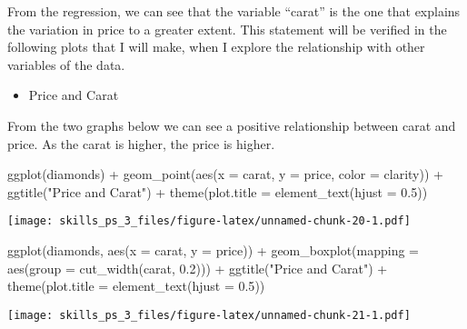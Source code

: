 \documentclass[
]{article}
\newenvironment{Shaded}{\begin{snugshade}}{\end{snugshade}}
\newcommand{\AttributeTok}[1]{\textcolor[rgb]{0.77,0.63,0.00}{#1}}
\newcommand{\FloatTok}[1]{\textcolor[rgb]{0.00,0.00,0.81}{#1}}
\newcommand{\FunctionTok}[1]{\textcolor[rgb]{0.00,0.00,0.00}{#1}}
\newcommand{\NormalTok}[1]{#1}
\newcommand{\SpecialCharTok}[1]{\textcolor[rgb]{0.00,0.00,0.00}{#1}}
\newcommand{\StringTok}[1]{\textcolor[rgb]{0.31,0.60,0.02}{#1}}
\providecommand{\tightlist}{%
  \setlength{\itemsep}{0pt}\setlength{\parskip}{0pt}}
\begin{document}
From the regression, we can see that the variable ``carat'' is the one
that explains the variation in price to a greater extent. This statement
will be verified in the following plots that I will make, when I explore
the relationship with other variables of the data.

\begin{itemize}
\tightlist
\item
  Price and Carat
\end{itemize}

From the two graphs below we can see a positive relationship between
carat and price. As the carat is higher, the price is higher.

\begin{Shaded}
\begin{Highlighting}[]
\FunctionTok{ggplot}\NormalTok{(diamonds) }\SpecialCharTok{+} 
  \FunctionTok{geom\_point}\NormalTok{(}\FunctionTok{aes}\NormalTok{(}\AttributeTok{x =}\NormalTok{ carat, }\AttributeTok{y =}\NormalTok{ price, }\AttributeTok{color =}\NormalTok{ clarity)) }\SpecialCharTok{+}
  \FunctionTok{ggtitle}\NormalTok{(}\StringTok{"Price and Carat"}\NormalTok{) }\SpecialCharTok{+}
  \FunctionTok{theme}\NormalTok{(}\AttributeTok{plot.title =} \FunctionTok{element\_text}\NormalTok{(}\AttributeTok{hjust =} \FloatTok{0.5}\NormalTok{))}
\end{Highlighting}
\end{Shaded}

\texttt{[image: skills\_ps\_3\_files/figure-latex/unnamed-chunk-20-1.pdf]}

\begin{Shaded}
\begin{Highlighting}[]
\FunctionTok{ggplot}\NormalTok{(diamonds, }\FunctionTok{aes}\NormalTok{(}\AttributeTok{x =}\NormalTok{ carat, }\AttributeTok{y =}\NormalTok{ price)) }\SpecialCharTok{+} 
  \FunctionTok{geom\_boxplot}\NormalTok{(}\AttributeTok{mapping =} \FunctionTok{aes}\NormalTok{(}\AttributeTok{group =} \FunctionTok{cut\_width}\NormalTok{(carat, }\FloatTok{0.2}\NormalTok{))) }\SpecialCharTok{+}
  \FunctionTok{ggtitle}\NormalTok{(}\StringTok{"Price and Carat"}\NormalTok{) }\SpecialCharTok{+}
  \FunctionTok{theme}\NormalTok{(}\AttributeTok{plot.title =} \FunctionTok{element\_text}\NormalTok{(}\AttributeTok{hjust =} \FloatTok{0.5}\NormalTok{))}
\end{Highlighting}
\end{Shaded}

\texttt{[image: skills\_ps\_3\_files/figure-latex/unnamed-chunk-21-1.pdf]}
\end{document}
